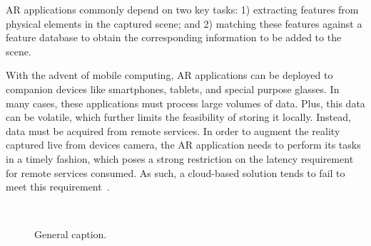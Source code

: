 AR applications commonly depend on two key tasks: 1) extracting features from physical elements in the captured scene; and 2) matching these features against a feature database to obtain the corresponding information to be added to the scene. 

With the advent of mobile computing, AR applications can be deployed to companion devices like smartphones, tablets, and special purpose glasses. In many cases, these applications must process large volumes of data. Plus, this data can be volatile, which further limits the feasibility of storing it locally. Instead, data must be acquired from remote services. In order to augment the reality captured live from devices camera, the AR application needs to perform its tasks in a timely fashion, which poses a strong restriction on the latency requirement for remote services consumed. As such, a cloud-based solution tends to fail to meet this requirement~\cite{GarrigaMendonca2017}. 



\begin{figure}[tbp]
	\centering
	\hfill
	~
	\hfill
	\caption{General caption.} \label{fig:1}
\end{figure}

